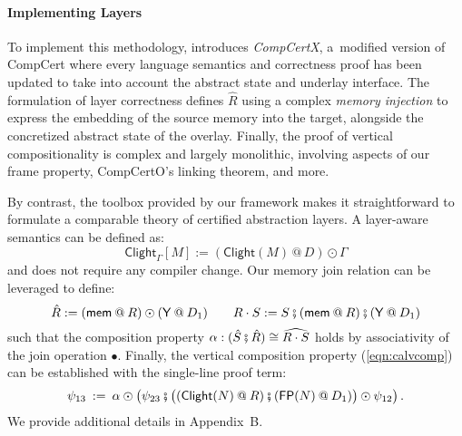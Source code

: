 \documentclass[acmsmall,screen,review,anonymous]{acmart}
\newcommand{\kw}[1]{\ensuremath{ \mathsf{#1} }}
\newcommand{\jr}{\mathsf{Y}}
\newcommand{\vcomp}{\fatsemi}
\begin{document}
\paragraph{Implementing Layers}

To implement this methodology,
\citet{popl15} introduces \emph{CompCertX},
a~modified version of CompCert where
every language semantics and correctness proof
has been updated
to take into account the abstract state and underlay interface.
The formulation of layer correctness
defines $\hat{R}$ using a complex \emph{memory injection}
to express the embedding of the source memory into the target,
alongside the concretized abstract state of the overlay.
Finally, the proof of vertical compositionality
is complex and largely monolithic,
involving aspects of
our frame property,
CompCertO's linking theorem, and more.

By contrast,
the toolbox provided by our framework
makes it straightforward to formulate a comparable theory
of certified abstraction layers.
A layer-aware semantics can be defined as:
\[
  \kw{Clight}_\Gamma[M] := (\kw{Clight}(M) \mathbin@ D) \odot \Gamma
\]
and does not require any compiler change.
Our memory join relation can be leveraged to define:
\[
  \hat{R} := 
    (\kw{mem} \mathbin@ R) \odot (\jr \mathbin@ D_1)
  \qquad
  R \cdot S :=
    S \vcomp (\kw{mem} \mathbin@ R) \vcomp (\jr \mathbin@ D_1)
\]
such that the composition property
$\alpha : (\hat{S} \vcomp \hat{R}) \cong \widehat{R \cdot S}$
holds by associativity of the join operation $\bullet$.
Finally,
the vertical composition property (\ref{eqn:calvcomp})
can be established with the single-line proof term:
\[
  \psi_{13} \: := \:
    \alpha \odot \big(
    \psi_{23} \vcomp
    \big( (\kw{Clight}(N) \mathbin@ R) \vcomp
          (\kw{FP}(N) \mathbin@ D_1) \big) \odot \psi_{12} \big)
  \,.
\]
We provide additional details in Appendix~B. %
\end{document}
